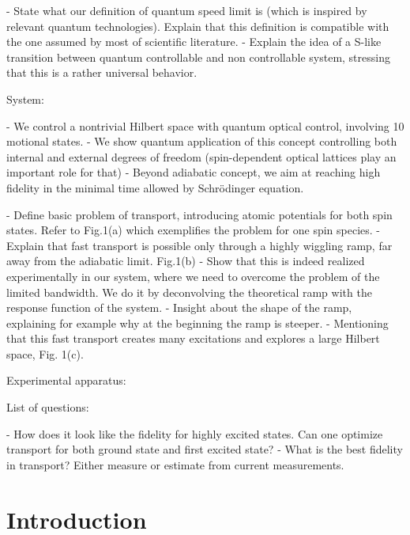 \documentclass[aps,pra,reprint,a4paper,nofootinbib,superscriptaddress,numbers,longbibliography,showpacs,showkeys,floatfix]{revtex4-1}
\begin{document}
- State what our definition of quantum speed limit is (which is inspired by relevant quantum technologies). Explain that this definition is compatible with the one assumed by most of scientific literature. 
- Explain the idea of a S-like transition between quantum controllable and non controllable system, stressing that this is a rather universal behavior.

System:

- We control a nontrivial Hilbert space with quantum optical control, involving 10 motional states.
- We show quantum application of this concept controlling both internal and external degrees of freedom (spin-dependent optical lattices play an important role for that)
- Beyond adiabatic concept, we aim at reaching high fidelity in the minimal time allowed by Schrödinger equation.


- Define basic problem of transport, introducing atomic potentials for both spin states. Refer to Fig.1(a) which exemplifies the problem for one spin species.
- Explain that fast transport is possible only through a highly wiggling ramp, far away from the adiabatic limit. Fig.1(b)
- Show that this is indeed realized experimentally in our system, where we need to overcome the problem of the limited bandwidth. We do it by deconvolving the theoretical ramp with the response function of the system.
- Insight about the shape of the ramp, explaining for example why at the beginning the ramp is steeper.
- Mentioning that this fast transport creates many excitations and explores a large Hilbert space, Fig. 1(c).


Experimental apparatus:




List of questions:

- How does it look like the fidelity for highly excited states. Can one optimize transport for both ground state and first excited state?
- What is the best fidelity in transport? Either measure or estimate from current measurements.

\section{Introduction}
\end{document}
